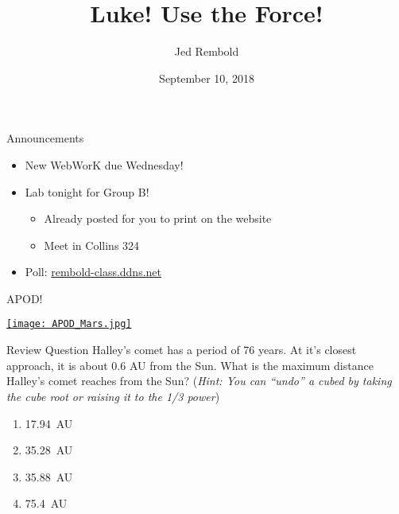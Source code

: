 \documentclass[pdf, aspectratio=169]{beamer}
\title{Luke! Use the Force!}
\date{September 10, 2018}
\author{Jed Rembold}
\begin{document}
\renewcommand*{\theenumi}{\Alph{enumi}}

\begin{frame}{Announcements}
	\begin{itemize}
		\item New WebWorK due Wednesday!
		\item Lab tonight for Group B!
		  \begin{itemize}
		    \item Already posted for you to print on the website
			\item Meet in Collins 324
		  \end{itemize}
		\item Poll: \url{rembold-class.ddns.net}
	\end{itemize}
\end{frame}

\begin{frame}{APOD!}
	\begin{center}
		\href{https://apod.nasa.gov/apod/ap180831.html}{\texttt{[image: APOD\_Mars.jpg]}}
	\end{center}
\end{frame}

\begin{frame}{Review Question}
	Halley's comet has a period of 76 years. At it's closest approach, it is about 0.6 AU from the Sun. What is the maximum distance Halley's comet reaches from the Sun? (\emph{Hint: You can ``undo'' a cubed by taking the cube root or raising it to the 1/3 power})
	\begin{enumerate}
		\item \SI{17.94}{AU}
		\item \alert<2>{\SI{35.28}{AU}}
		\item \SI{35.88}{AU}
		\item \SI{75.4}{AU}
	\end{enumerate}
	
  
\end{frame}
\end{document}
